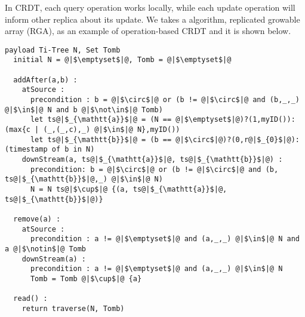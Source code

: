 In CRDT, each query operation works locally, while each update operation will inform other replica about its update. We takes a algorithm, replicated growable array (RGA), as an example of operation-based CRDT and it is shown below.


\begin{lstlisting}[caption={Pseudo-code of the Replicated Growable Array (RGA) CRDT}, captionpos=b,label={lst:rga}]
  payload Ti-Tree N, Set Tomb
  initial N = @|$\emptyset$|@, Tomb = @|$\emptyset$|@

  addAfter(a,b) :
    atSource :
      precondition : b = @|$\circ$|@ or (b != @|$\circ$|@ and (b,_,_) @|$\in$|@ N and b @|$\not\in$|@ Tomb)
      let ts@|$_{\mathtt{a}}$|@ = (N == @|$\emptyset$|@)?(1,myID()):(max{c | (_,(_,c),_) @|$\in$|@ N},myID())
      let ts@|$_{\mathtt{b}}$|@ = (b == @|$\circ$|@)?(0,r@|$_{0}$|@):(timestamp of b in N)
    downStream(a, ts@|$_{\mathtt{a}}$|@, ts@|$_{\mathtt{b}}$|@) :
      precondition: b = @|$\circ$|@ or (b != @|$\circ$|@ and (b, ts@|$_{\mathtt{b}}$|@,_) @|$\in$|@ N)
      N = N ts@|$\cup$|@ {(a, ts@|$_{\mathtt{a}}$|@, ts@|$_{\mathtt{b}}$|@)}

  remove(a) :
    atSource :
      precondition : a != @|$\emptyset$|@ and (a,_,_) @|$\in$|@ N and a @|$\notin$|@ Tomb
    downStream(a) :
      precondition : a != @|$\emptyset$|@ and (a,_,_) @|$\in$|@ N
      Tomb = Tomb @|$\cup$|@ {a}

  read() :
    return traverse(N, Tomb)
\end{lstlisting}


\renewcommand{\algorithmcfname}{CRDT Implementation}
\noindent
\noindent%



